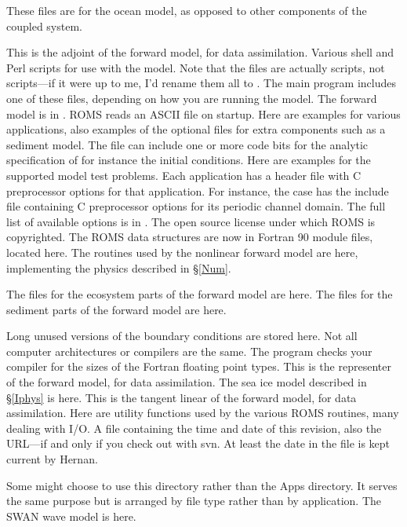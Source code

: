 \begin{klist}
  These files are for the ocean model, as opposed to other components of
  the coupled system.
\begin{klist}
   This is the adjoint of the forward model, for data
  assimilation.
   Various shell and Perl scripts for use with the model.
  Note that the  files are actually  scripts, not
   scripts---if it were up to me, I'd rename them all to .
   The main program includes one of these files,
  depending on how you are running the model. The forward model is in
  .
   ROMS reads an ASCII file on startup. Here are
  examples for various applications, also examples of the optional
  files for extra components such as a sediment model.
   The file  can include one
  or more code bits for the analytic specification of for instance the
  initial conditions. Here are examples for the supported model test
  problems.
   Each application has a header file with C
  preprocessor options for that application. For instance, the
   case has the include file 
  containing C preprocessor options for its periodic channel domain.
  The full list of available options is in .
   The open source license under which ROMS
  is copyrighted.
   The ROMS data structures are now in Fortran 90
  module files, located here.
   The routines used by the nonlinear forward model
  are here, implementing the physics described in \S\ref{Num}.
  \begin{klist}
     The files for the ecosystem parts of the forward
    model are here.
     The files for the sediment parts of the forward
    model are here.
  \end{klist}
   Long unused versions of the boundary conditions
  are stored here.
   Not all computer architectures or compilers are the same.
  The  program checks your compiler for the sizes of the
  Fortran floating point types.
   This is the representer of the forward model, for
  data assimilation.
   The sea ice model described in \S\ref{Iphys} is here.
   This is the tangent linear of the forward model, for data
  assimilation.
   Here are utility functions used by the various
  ROMS routines, many dealing with I/O.
   A file containing the time and date of this
   revision, also the  URL---if and only if you
  check out with svn. At least the date in the file is kept current
  by Hernan.
\end{klist}
   Some might choose to use this directory rather than
  the Apps directory. It serves the same purpose but is arranged
  by file type rather than by application.
   The SWAN wave model is here.
\end{klist}

